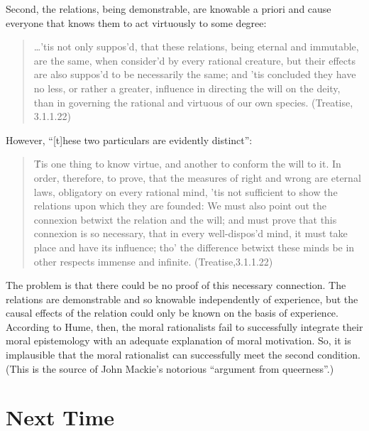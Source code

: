 Second, the relations, being demonstrable, are knowable a priori and cause everyone that knows them to act virtuously to some degree:

\begin{quote}
	\ldots 'tis not only suppos'd, that these relations, being eternal and immutable, are the same, when consider'd by every rational creature, but their effects are also suppos'd to be necessarily the same; and 'tis concluded they have no less, or rather a greater, influence in directing the will on the deity, than in governing the rational and virtuous of our own species. (Treatise, 3.1.1.22)
\end{quote}


However, ``[t]hese two particulars are evidently distinct'':

\begin{quote}
	\'Tis one thing to know virtue, and another to conform the will to it. In order, therefore, to prove, that the measures of right and wrong are eternal laws, obligatory on every rational mind, 'tis not sufficient to show the relations upon which they are founded: We must also point out the connexion betwixt the relation and the will; and must prove that this connexion is so necessary, that in every well-dispos'd mind, it must take place and have its influence; tho' the difference betwixt these minds be in other respects immense and infinite. (Treatise,3.1.1.22)
\end{quote}

The problem is that there could be no proof of this necessary connection. The relations are demonstrable and so knowable independently of experience, but the causal effects of the relation could only be known on the basis of experience. According to Hume, then, the moral rationalists fail to successfully integrate their moral epistemology with an adequate explanation of moral motivation. So, it is implausible that the moral rationalist can successfully meet the second condition. (This is the source of John Mackie's notorious ``argument from queerness''.) \change


\section{Next Time}\label{sec:readings_for_next_time} %

% 

